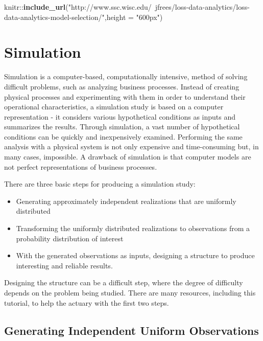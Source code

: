 \documentclass[]{book}
\newenvironment{Shaded}{\begin{snugshade}}{\end{snugshade}}
\newcommand{\KeywordTok}[1]{\textcolor[rgb]{0.13,0.29,0.53}{\textbf{{#1}}}}
\newcommand{\DataTypeTok}[1]{\textcolor[rgb]{0.13,0.29,0.53}{{#1}}}
\newcommand{\StringTok}[1]{\textcolor[rgb]{0.31,0.60,0.02}{{#1}}}
\newcommand{\NormalTok}[1]{{#1}}
\begin{document}
\begin{Shaded}
\begin{Highlighting}[]
\NormalTok{knitr::}\KeywordTok{include_url}\NormalTok{(}\StringTok{"http://www.ssc.wisc.edu/~jfrees/loss-data-analytics/loss-data-analytics-model-selection/"}\NormalTok{,}\DataTypeTok{height =} \StringTok{"600px"}\NormalTok{)}
\end{Highlighting}
\end{Shaded}

\chapter{Simulation}\label{simulation}

Simulation is a computer-based, computationally intensive, method of
solving difficult problems, such as analyzing business processes.
Instead of creating physical processes and experimenting with them in
order to understand their operational characteristics, a simulation
study is based on a computer representation - it considers various
hypothetical conditions as inputs and summarizes the results. Through
simulation, a vast number of hypothetical conditions can be quickly and
inexpensively examined. Performing the same analysis with a physical
system is not only expensive and time-consuming but, in many cases,
impossible. A drawback of simulation is that computer models are not
perfect representations of business processes.

There are three basic steps for producing a simulation study:

\begin{itemize}
\item
  Generating approximately independent realizations that are uniformly
  distributed
\item
  Transforming the uniformly distributed realizations to observations
  from a probability distribution of interest
\item
  With the generated observations as inputs, designing a structure to
  produce interesting and reliable results.
\end{itemize}

Designing the structure can be a difficult step, where the degree of
difficulty depends on the problem being studied. There are many
resources, including this tutorial, to help the actuary with the first
two steps.

\section{Generating Independent Uniform
Observations}\label{generating-independent-uniform-observations}
\end{document}
